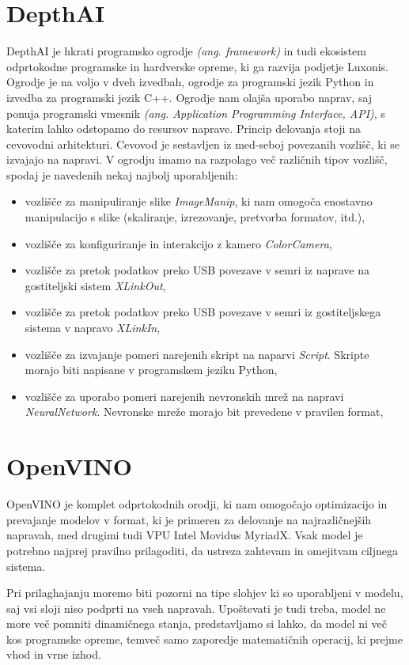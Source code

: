 \documentclass[a4paper,12pt,openright]{book}
\begin{document}
\section{DepthAI}
DepthAI je hkrati programsko ogrodje \emph{(ang. framework)} in tudi ekosistem odprtokodne programske in hardverske opreme, ki ga razvija podjetje Luxonis. Ogrodje je na voljo v dveh izvedbah, ogrodje za programski jezik Python in izvedba za programski jezik C++. Ogrodje nam olajša uporabo naprav, saj ponuja programski vmesnik \emph{(ang. Application Programming Interface, API)}, s katerim lahko odstopamo do resursov naprave. Princip delovanja stoji na cevovodni arhitekturi. Cevovod je sestavljen iz med-seboj povezanih vozlišč, ki se izvajajo na napravi. V ogrodju imamo na razpolago več različnih tipov vozlišč, spodaj je navedenih nekaj najbolj uporabljenih:
\begin{itemize}
    \item vozlišče za manipuliranje slike \emph{ImageManip}, ki nam omogoča enostavno manipulacijo s slike (skaliranje, izrezovanje, pretvorba formatov, itd.),
    \item vozlišče za konfiguriranje in interakcijo z kamero \emph{ColorCamera},
    \item vozlišče za pretok podatkov preko USB povezave v semri iz naprave na gostiteljski sistem \emph{XLinkOut},
    \item vozlišče za pretok podatkov preko USB povezave v semri iz gostiteljskega sistema v napravo \emph{XLinkIn},
    \item vozlišče za izvajanje pomeri narejenih skript na naparvi \emph{Script}. Skripte morajo biti napisane v programskem jeziku Python,
    \item vozlišče za uporabo pomeri narejenih nevronskih mrež na napravi \emph{NeuralNetwork}. Nevronske mreže morajo bit prevedene v pravilen format,
\end{itemize}

\section{OpenVINO}
OpenVINO je komplet odprtokodnih orodji, ki nam omogočajo optimizacijo in prevajanje modelov v format, ki je primeren za delovanje na najrazličnejših napravah, med drugimi tudi VPU Intel Movidus MyriadX. Vsak model je potrebno najprej pravilno prilagoditi, da ustreza zahtevam in omejitvam ciljnega sistema.

Pri prilaghajanju moremo biti pozorni na tipe slohjev ki so uporabljeni v modelu, saj vsi sloji niso podprti na vseh napravah. Upoštevati je tudi treba, model ne more več pomniti dinamičnega stanja, predstavljamo si lahko, da model ni več kos programske opreme, temveč samo zaporedje matematičnih operacij, ki prejme vhod in vrne izhod.
\end{document}
